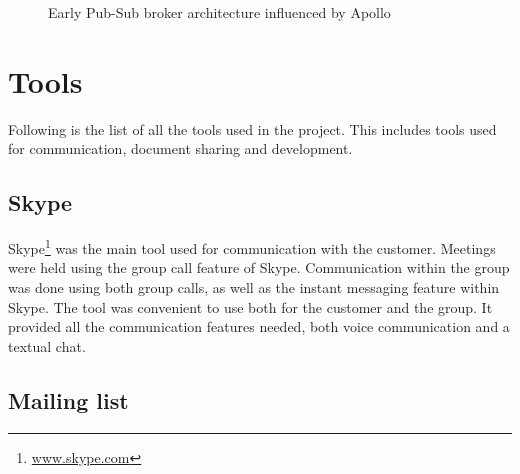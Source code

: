 \begin{center}
  \begin{figure}[ht!]
    \caption{Early Pub-Sub broker architecture influenced by Apollo}
    \label{fig:arch_proposal}
  \end{figure}
\end{center}

\section{Tools}
\label{sec:prestudies-tools}

Following is the list of all the tools used in the project. This includes tools used for communication, document sharing and development.

\subsection{Skype}
\label{subsec:prestudies-tools-skype}

Skype\footnote{\url{www.skype.com}} was the main tool used for communication with the customer. Meetings were held using the group call feature of Skype. Communication within the group was done using both group calls, as well as the instant messaging feature within Skype. The tool was convenient to use both for the customer and the group. It provided all the communication features needed, both voice communication and a textual chat.

\subsection{Mailing list}
\label{subsec:prestudies-tools-mailinglist}

